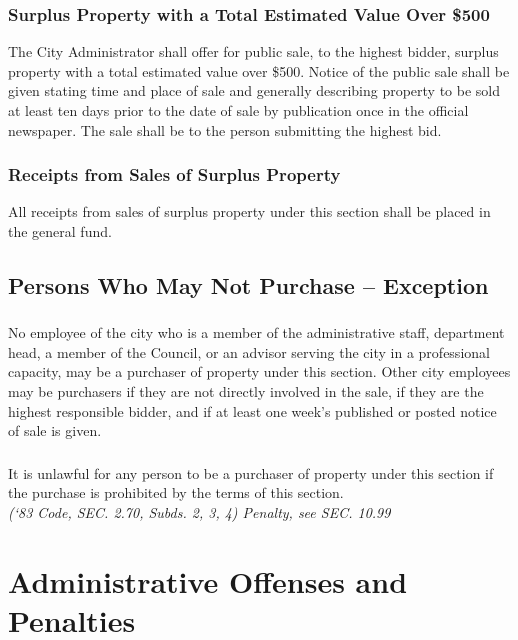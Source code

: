 \subsubsection{Surplus Property with a Total Estimated Value Over \$500}
The City Administrator shall offer for public sale, to the highest bidder, surplus property with a total estimated value over \$500.  Notice of the public sale shall be given stating time and place of sale and generally describing property to be sold at least ten days prior to the date of sale by publication once in the official newspaper.  The sale shall be to the person submitting the highest bid.
\subsubsection{Receipts from Sales of Surplus Property}
All receipts from sales of surplus property under this section shall be placed in the general fund.
\subsection{Persons Who May Not Purchase -- Exception}
\subsubsection{}
No employee of the city who is a member of the administrative staff, department head, a member of the Council, or an advisor serving the city in a professional capacity, may be a purchaser of property under this section.  Other city employees may be purchasers if they are not directly involved in the sale, if they are the highest responsible bidder, and if at least one week’s published or posted notice of sale is given.
\subsubsection{}
It is unlawful for any person to be a purchaser of property under this section if the purchase is prohibited by the terms of this section.\\
\emph{(‘83 Code, SEC. 2.70, Subds. 2, 3, 4) Penalty, see SEC. 10.99}

\section{Administrative Offenses and Penalties}
